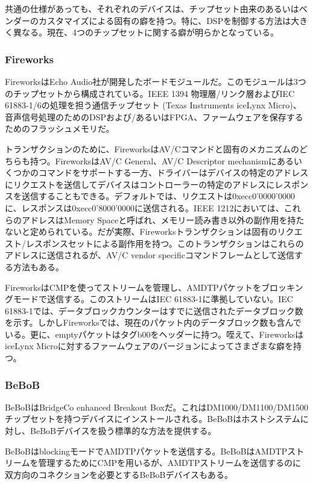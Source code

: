 \documentclass[onecolumn]{jarticle}
\begin{document}
共通の仕様があっても、それぞれのデバイスは、チップセット由来のあるいはベンダーのカスタマイズによる固有の癖を持つ。特に、DSPを制御する方法は大きく異なる。現在、4つのチップセットに関する癖が明らかとなっている。


\subsubsection{Fireworks}
FireworksはEcho Audio社が開発したボードモジュールだ。このモジュールは3つのチップセットから構成されている。IEEE 1394 物理層/リンク層およびIEC 61883-1/6の処理を担う通信チップセット (Texas Instruments iceLynx Micro)、音声信号処理のためのDSPおよび/あるいはFPGA、ファームウェアを保存するためのフラッシュメモリだ。

トランザクションのために、FireworksはAV/Cコマンドと固有のメカニズムのどちらも持つ。FireworksはAV/C General\cite{avc-general-4-2}、AV/C Descriptor mechanism\cite{avc-general-enhancement}にあるいくつかのコマンドをサポートする一方、ドライバーはデバイスの特定のアドレスにリクエストを送信してデバイスはコントローラーの特定のアドレスにレスポンスを送信することもできる。デフォルトでは、リクエストは0xecc0'0000'0000に、レスポンスは0xecc0'8000'0000に送信される。IEEE 1212においては、これらのアドレスはMemory Spaceと呼ばれ、メモリー読み書き以外の副作用を持たないと定められている。だが実際、Fireworksトランザクションは固有のリクエスト/レスポンスセットによる副作用を持つ。このトランザクションはこれらのアドレスに送信されるが、AV/C vendor specificコマンドフレームとして送信する方法もある。

FireworksはCMPを使ってストリームを管理し、AMDTPパケットをブロッキングモードで送信する。このストリームはIEC 61883-1に準拠していない。IEC 61883-1では、データブロックカウンターはすでに送信されたデータブロック数を示す。しかしFireworksでは、現在のパケット内のデータブロック数も含んでいる。更に、emptyパケットはタグb00をヘッダーに持つ。咥えて、FireworksはiceLynx Microに対するファームウェアのバージョンによってさまざまな癖を持つ。

\subsubsection{BeBoB}

BeBoBはBridgeCo enhanced Breakout Boxだ。これはDM1000/DM1100/DM1500チップセットを持つデバイスにインストールされる。BeBoBはホストシステムに対し、BeBoBデバイスを扱う標準的な方法を提供する。

BeBoBはblockingモードでAMDTPパケットを送信する。BeBoBはAMDTPストリームを管理するためにCMPを用いるが、AMDTPストリームを送信するのに双方向のコネクションを必要とするBeBoBデバイスもある。
\end{document}
